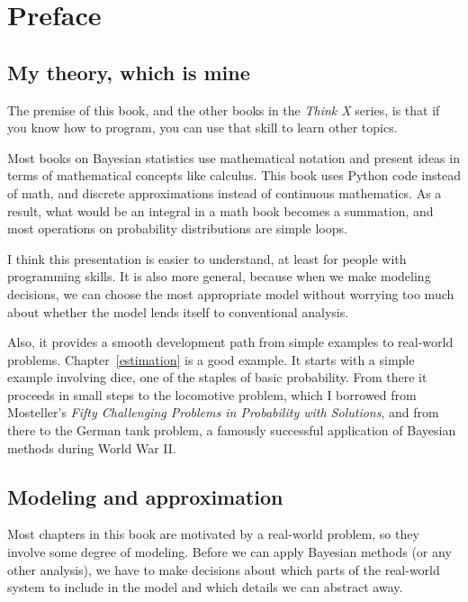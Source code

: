\documentclass[12pt]{book}
\theoremstyle{exercise}
\begin{document}
\fi

\chapter{Preface}
\label{preface}

\section{My theory, which is mine}

The premise of this book, and the other books in the {\it Think X}
series, is that if you know how to program, you
can use that skill to learn other topics.

Most books on Bayesian statistics use mathematical notation and
present ideas in terms of mathematical concepts like calculus.
This book uses Python code instead of math, and discrete approximations
instead of continuous mathematics.  As a result, what would
be an integral in a math book becomes a summation, and
most operations on probability distributions are simple loops.

I think this presentation is easier to understand, at least for people with
programming skills.  It is also more general, because when we make
modeling decisions, we can choose the most appropriate model without
worrying too much about whether the model lends itself to conventional
analysis.

Also, it provides a smooth development path from simple examples to
real-world problems.  Chapter~\ref{estimation} is a good example.  It
starts with a simple example involving dice, one of the staples of
basic probability.  From there it proceeds in small steps to the
locomotive problem, which I borrowed from Mosteller's {\it
  Fifty Challenging Problems in Probability with Solutions}, and from
there to the German tank problem, a famously successful application of
Bayesian methods during World War II.


\section{Modeling and approximation}

Most chapters in this book are motivated by a real-world problem, so
they involve some degree of modeling.  Before we can apply Bayesian
methods (or any other analysis), we have to make decisions about which
parts of the real-world system to include in the model and which
details we can abstract away.  
\end{document}
